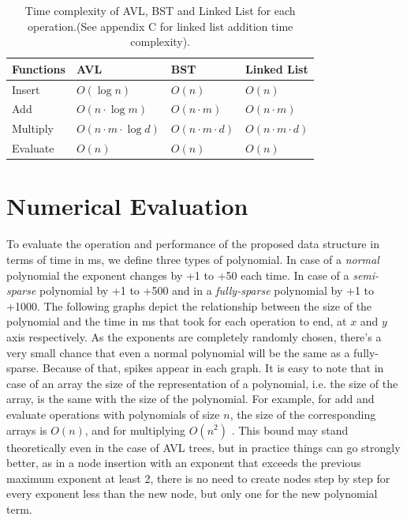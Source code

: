 \documentclass[journal,article,submit,moreauthors,algorithms]{Definitions/mdpi}
\begin{document}
\medbreak

\begin{table}[H] 
\caption{Time complexity of AVL, BST and Linked List for each operation.(See appendix C for linked list addition time complexity).\label{fig:3}}
\begin{tabularx}{\textwidth}{CCCC}
\toprule
\textbf{Functions} & \textbf{AVL}	& \textbf{BST}	& \textbf{Linked List}\\
\midrule
Insert & $O(\log n)$ & $O(n)$ & $O(n)$ \\
Add & $O(n \cdot \log m)$ & $O(n \cdot m)$ & $O(n\cdot m)$  \\
Multiply & $O(n \cdot m \cdot \log d)$ & $O(n \cdot m \cdot d)$ & $O(n \cdot  m \cdot d)$ \\
Evaluate & $O(n)$ & $O(n)$ & $O(n)$ \\
\bottomrule
\end{tabularx}
\end{table}


%

%

%

%

%

%

%

%

%
\section{Numerical Evaluation}

To evaluate the operation and performance of the proposed
data structure in terms of time in ms, we define three types of polynomial. In case of a \emph{normal} polynomial the exponent changes by +1 to +50 each time. In case of a \emph{semi-sparse} polynomial by +1 to +500 and in a \emph{fully-sparse} polynomial by +1 to +1000. The following graphs depict the relationship between the size of the polynomial and the time in ms that took for each operation to end, at $x$ and $y$ axis respectively. As the exponents are completely randomly chosen, there's a very small chance that even a normal polynomial will be the same as a fully-sparse. Because of that, spikes appear in each graph. It is easy to note that in case of an array the size of the representation of a polynomial, i.e. the size of the array, is the same with the size of the polynomial. For example, for add and evaluate operations with polynomials of size $n$, the size of the corresponding arrays is $O(n)$, and for multiplying $O(n^2)$ \cite{ArraysAnalysis}. This bound may stand theoretically even in the case of AVL trees, but in practice things can go strongly better, as in a node insertion with an exponent that exceeds the previous maximum exponent at least 2, there is no need to create nodes step by step for every exponent less than the new node, but only one for the new polynomial term.\par
\end{document}
